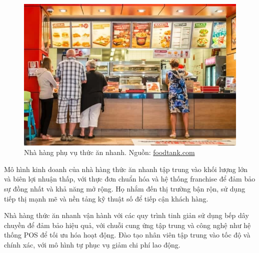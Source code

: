 \begin{figure}[H]
    \centering
    \includegraphics[width=15cm]{Images/fastfood.jpg}
    \vspace{0.5cm}
    \caption{Nhà hàng phụ vụ thức ăn nhanh. Nguồn: \href{https://foodtank.com/news/2015/08/world-health-organization-study-proves-need-for-regulation-of-fast-food/}{foodtank.com}}
\end{figure}

Mô hình kinh doanh của nhà hàng thức ăn nhanh tập trung vào khối lượng lớn và biên lợi nhuận thấp, với thực đơn chuẩn hóa và hệ thống franchise để đảm bảo sự đồng nhất và khả năng mở rộng. Họ nhắm đến thị trường bận rộn, sử dụng tiếp thị mạnh mẽ và nền tảng kỹ thuật số để tiếp cận khách hàng.

Nhà hàng thức ăn nhanh vận hành với các quy trình tinh giản sử dụng bếp dây chuyền để đảm bảo hiệu quả, với chuỗi cung ứng tập trung và công nghệ như hệ thống POS để tối ưu hóa hoạt động. Đào tạo nhân viên tập trung vào tốc độ và chính xác, với mô hình tự phục vụ giảm chi phí lao động.

